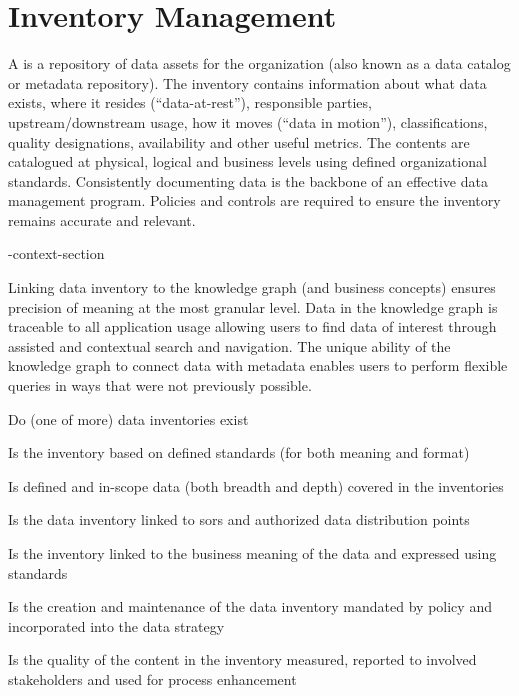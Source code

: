 \section{Inventory Management}\label{sec:ekgmm-b-2-3} %

A  is a repository of data assets for the organization (also known as a
data catalog or metadata repository).
The inventory contains information about what data exists, where it resides (“data-at-rest”),
responsible parties, upstream/downstream usage, how it moves (“data in motion”), classifications,
quality designations, availability and other useful metrics.
The contents are catalogued at physical, logical and business levels using defined organizational standards.
Consistently documenting data is the backbone of an effective data management program.
Policies and controls are required to ensure the inventory remains accurate and relevant.

\ekgmm-context-section

Linking data inventory to the knowledge graph (and business concepts) ensures precision of meaning at the most
granular level.
Data in the knowledge graph is traceable to all application usage allowing users to find data of interest through
assisted and contextual search and navigation.
The unique ability of the knowledge graph to connect data with metadata enables users to perform flexible queries
in ways that were not previously possible.

\kgmmcorequestionssection

\begin{core-questions}

  \item [\thesection.1] Do (one of more) data inventories exist
  \item [\thesection.2] Is the inventory based on defined standards (for both meaning and format)
  \item [\thesection.3] Is defined and in-scope data (both breadth and depth) covered in the inventories
  \item [\thesection.4] Is the data inventory linked to \glspl{sor} and authorized data distribution points
  \item [\thesection.5] Is the inventory linked to the business meaning of the data and expressed using standards
  \item [\thesection.6] Is the creation and maintenance of the data inventory mandated by policy and incorporated
                        into the data strategy
  \item [\thesection.7] Is the quality of the content in the inventory measured, reported to involved stakeholders
                        and used for process enhancement

\end{core-questions}

